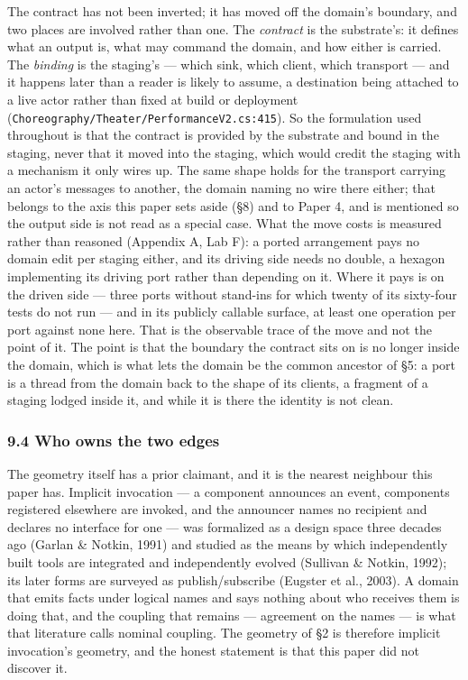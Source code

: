 \documentclass[
]{article}
\newcounter{none} %
\begin{document}
The contract has not been inverted; it has moved off the domain's
boundary, and two places are involved rather than one. The
\emph{contract} is the substrate's: it defines what an output is, what
may command the domain, and how either is carried. The \emph{binding} is
the staging's --- which sink, which client, which transport --- and it
happens later than a reader is likely to assume, a destination being
attached to a live actor rather than fixed at build or deployment
(\texttt{Choreography/Theater/PerformanceV2.cs:415}). So the formulation
used throughout is that the contract is provided by the substrate and
bound in the staging, never that it moved into the staging, which would
credit the staging with a mechanism it only wires up. The same shape
holds for the transport carrying an actor's messages to another, the
domain naming no wire there either; that belongs to the axis this paper
sets aside (§8) and to Paper 4, and is mentioned so the output side is
not read as a special case. What the move costs is measured rather than
reasoned (Appendix A, Lab F): a ported arrangement pays no domain edit
per staging either, and its driving side needs no double, a hexagon
implementing its driving port rather than depending on it. Where it pays
is on the driven side --- three ports without stand-ins for which twenty
of its sixty-four tests do not run --- and in its publicly callable
surface, at least one operation per port against none here. That is the
observable trace of the move and not the point of it. The point is that
the boundary the contract sits on is no longer inside the domain, which
is what lets the domain be the common ancestor of §5: a port is a thread
from the domain back to the shape of its clients, a fragment of a
staging lodged inside it, and while it is there the identity is not
clean.

\subsubsection{9.4 Who owns the two edges}\label{who-owns-the-two-edges}

The geometry itself has a prior claimant, and it is the nearest
neighbour this paper has. Implicit invocation --- a component announces
an event, components registered elsewhere are invoked, and the announcer
names no recipient and declares no interface for one --- was formalized
as a design space three decades ago (Garlan \& Notkin, 1991) and studied
as the means by which independently built tools are integrated and
independently evolved (Sullivan \& Notkin, 1992); its later forms are
surveyed as publish/subscribe (Eugster et al., 2003). A domain that
emits facts under logical names and says nothing about who receives them
is doing that, and the coupling that remains --- agreement on the names
--- is what that literature calls nominal coupling. The geometry of §2
is therefore implicit invocation's geometry, and the honest statement is
that this paper did not discover it.
\end{document}

